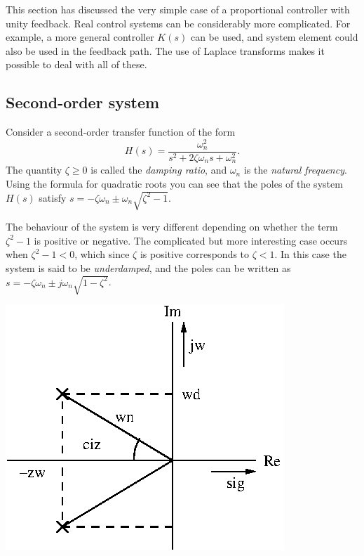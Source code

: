 \documentclass[10pt]{beamer}
\begin{document}
This section has discussed the very simple case of a proportional controller with unity feedback.  Real control systems can be considerably more complicated.  For example, a more general controller $K(s)$ can be used, and system element could also be used in the feedback path.  The use of Laplace transforms makes it possible to deal with all of these.

\subsection{Second-order system}

Consider a second-order transfer function of the form
\begin{equation*}
  H(s) = \frac{\omega_n^2}{s^2 + 2 \zeta \omega_n s + \omega_n^2}.
\end{equation*}
The quantity $\zeta \geq 0$ is called the {\em damping ratio}, and $\omega_n$ is the {\em natural frequency}.  Using the formula for quadratic roots you can see that the poles of the system $H(s)$ satisfy $s = -\zeta \omega_n \pm \omega_n \sqrt{\zeta^2 - 1}$.

The behaviour of the system is very different depending on whether the term $\zeta^2-1$ is positive or negative.  The complicated but more interesting case occurs when $\zeta^2-1<0$, which since $\zeta$ is positive corresponds to $\zeta < 1$.  In this case the system is said to be {\em underdamped}, and the poles can be written as $s = -\zeta \omega_n \pm j \omega_n \sqrt{1 - \zeta^2}$.
\begin{center}
  \includegraphics{pzplot2order}
\end{center}
\end{document}
